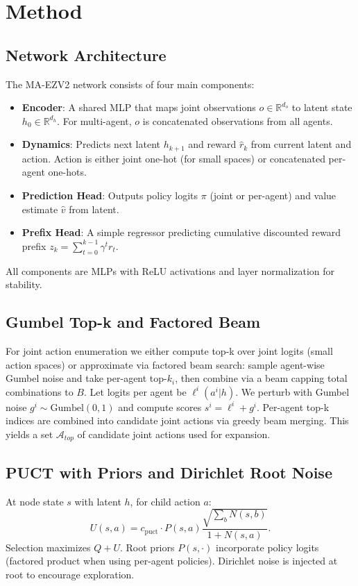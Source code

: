 \documentclass{article}
\begin{document}
\section{Method}
\subsection{Network Architecture}
The MA-EZV2 network consists of four main components:
\begin{itemize}
  \item \textbf{Encoder}: A shared MLP that maps joint observations $o \in \mathbb{R}^{d_o}$ to latent state $h_0 \in \mathbb{R}^{d_h}$. For multi-agent, $o$ is concatenated observations from all agents.
  \item \textbf{Dynamics}: Predicts next latent $h_{k+1}$ and reward $\hat{r}_k$ from current latent and action. Action is either joint one-hot (for small spaces) or concatenated per-agent one-hots.
  \item \textbf{Prediction Head}: Outputs policy logits $\pi$ (joint or per-agent) and value estimate $\hat{v}$ from latent.
  \item \textbf{Prefix Head}: A simple regressor predicting cumulative discounted reward prefix $z_k = \sum_{t=0}^{k-1} \gamma^t r_t$.
\end{itemize}
All components are MLPs with ReLU activations and layer normalization for stability.

\subsection{Gumbel Top-k and Factored Beam}
For joint action enumeration we either compute top-k over joint logits (small action spaces) or approximate via factored beam search: sample agent-wise Gumbel noise and take per-agent top-$k_i$, then combine via a beam capping total combinations to $B$. Let logits per agent be $\ell^i(a^i|h)$. We perturb with Gumbel noise $g^i\sim\text{Gumbel}(0,1)$ and compute scores $s^i=\ell^i+g^i$. Per-agent top-k indices are combined into candidate joint actions via greedy beam merging. This yields a set $\mathcal{A}_{top}$ of candidate joint actions used for expansion.

\subsection{PUCT with Priors and Dirichlet Root Noise}
At node state $s$ with latent $h$, for child action $a$:
\begin{equation}
U(s,a) = c_{\text{puct}} \cdot P(s,a)\frac{\sqrt{\sum_b N(s,b)}}{1+N(s,a)} .
\end{equation}
Selection maximizes $Q+U$. Root priors $P(s,\cdot)$ incorporate policy logits (factored product when using per-agent policies). Dirichlet noise is injected at root to encourage exploration.
\end{document}
